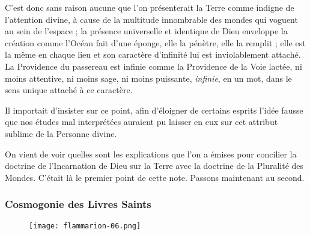 \documentclass[a4paper, 11pt, oneside]{article}
\begin{document}
C'est donc sans raison aucune que l'on présenterait la Terre comme indigne de l'attention divine, à cause de la multitude innombrable des mondes qui voguent au sein de l'espace ; la présence universelle et identique de Dieu enveloppe la création comme l'Océan fait d'une éponge, elle la pénètre, elle la remplit ; elle est la même en chaque lieu et son caractère d'infinité lui est inviolablement attaché. La Providence du passereau est infinie comme la Providence de la Voie lactée, ni moins attentive, ni moins sage, ni moins puissante, \emph{infinie}, en un mot, dans le sens unique attaché à ce caractère.

Il importait d'insister sur ce point, afin d'éloigner de certains esprits l'idée fausse que nos études mal interprétées auraient pu laisser en eux sur cet attribut sublime de la Personne divine.

On vient de voir quelles sont les explications que l'on a émises pour concilier la doctrine de l'Incarnation de Dieu sur la Terre avec la doctrine de la Pluralité des Mondes. C'était là le premier point de cette note. Passons maintenant au second.

\subsubsection{Cosmogonie des Livres Saints}
\begin{figure}[H]
\centering
\texttt{[image: flammarion-06.png]}
\end{figure}
\end{document}

